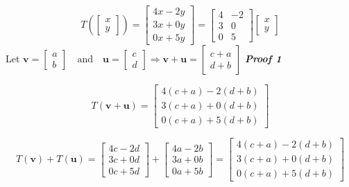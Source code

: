 \documentclass[letter,11pt]{article}
\begin{document}
\begin{tcolorbox}[boxrule=1mm, width=(.9\linewidth),before=\hfill,after=\hfill,adjusted title={Problem \# 6.i Solutions}]
$$T\left(\begin{bmatrix}x \\ y\end{bmatrix}\right) = \begin{bmatrix} 4x-2y\\ 3x+0y\\0x+5y \end{bmatrix} = \begin{bmatrix} 4 & -2\\ 3 & 0\\ 0 & 5\end{bmatrix}\begin{bmatrix}x\\y \end{bmatrix}$$
        Let $\boldsymbol{v} = \begin{bmatrix} a\\b \end{bmatrix}\quad \text{and} \quad \boldsymbol{u} = \begin{bmatrix} c\\d \end{bmatrix}\Longrightarrow \boldsymbol{v}+\boldsymbol{u} = \begin{bmatrix} c+a\\ d+b \end{bmatrix}$  
\tcblower
    \textbf{\textit{Proof 1}}
    
    $$T\left(\boldsymbol{v}+\boldsymbol{u}\right) = \begin{bmatrix} 4(c+a) - 2(d+b)\\ 3(c+a)+0(d+b)\\ 0(c+a)+5(d+b) \end{bmatrix}$$

    $$T\left(\boldsymbol{v}\right)+T\left(\boldsymbol{u}\right) = \begin{bmatrix}4c-2d\\ 3c+0d\\0c+5d\end{bmatrix} + \begin{bmatrix} 4a-2b\\ 3a+0b\\0a+5b \end{bmatrix} = \begin{bmatrix}4(c+a)-2(d+b)\\ 3(c+a)+0(d+b)\\ 0(c+a)+ 5(d+b)\end{bmatrix} $$
    

\end{tcolorbox}
\end{document}
